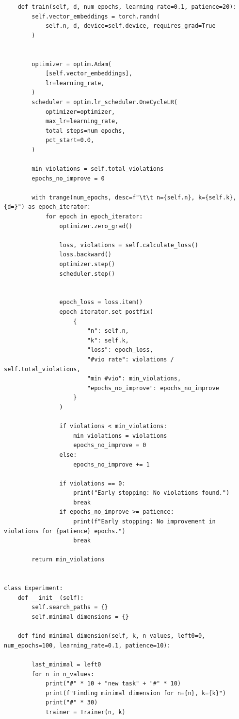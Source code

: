 \begin{lstlisting}
    def train(self, d, num_epochs, learning_rate=0.1, patience=20):
        self.vector_embeddings = torch.randn(
            self.n, d, device=self.device, requires_grad=True
        )


        optimizer = optim.Adam(
            [self.vector_embeddings],
            lr=learning_rate,
        )
        scheduler = optim.lr_scheduler.OneCycleLR(
            optimizer=optimizer,
            max_lr=learning_rate,
            total_steps=num_epochs,
            pct_start=0.0,
        )

        min_violations = self.total_violations
        epochs_no_improve = 0

        with trange(num_epochs, desc=f"\t\t n={self.n}, k={self.k}, {d=}") as epoch_iterator:
            for epoch in epoch_iterator:
                optimizer.zero_grad()

                loss, violations = self.calculate_loss()
                loss.backward()
                optimizer.step()
                scheduler.step()


                epoch_loss = loss.item()
                epoch_iterator.set_postfix(
                    {
                        "n": self.n,
                        "k": self.k,
                        "loss": epoch_loss,
                        "#vio rate": violations / self.total_violations,
                        "min #vio": min_violations,
                        "epochs_no_improve": epochs_no_improve
                    }
                )

                if violations < min_violations:
                    min_violations = violations
                    epochs_no_improve = 0
                else:
                    epochs_no_improve += 1

                if violations == 0:
                    print("Early stopping: No violations found.")
                    break
                if epochs_no_improve >= patience:
                    print(f"Early stopping: No improvement in violations for {patience} epochs.")
                    break

        return min_violations


class Experiment:
    def __init__(self):
        self.search_paths = {}
        self.minimal_dimensions = {}

    def find_minimal_dimension(self, k, n_values, left0=0, num_epochs=100, learning_rate=0.1, patience=10):

        last_minimal = left0
        for n in n_values:
            print("#" * 10 + "new task" + "#" * 10)
            print(f"Finding minimal dimension for n={n}, k={k}")
            print("#" * 30)
            trainer = Trainer(n, k)


\end{lstlisting}
